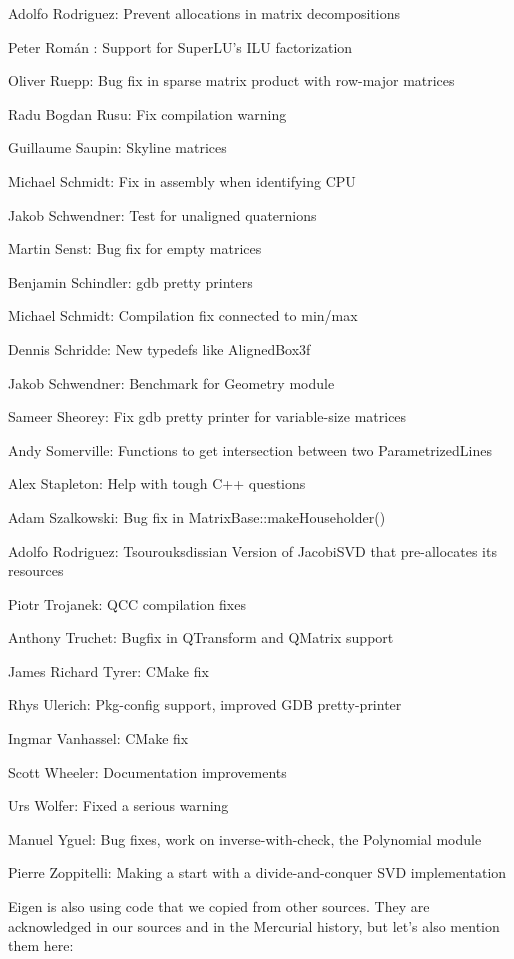 Adolfo Rodriguez:  Prevent allocations in matrix decompositions  

Peter Román : Support for SuperLU's ILU factorization  

Oliver Ruepp:  Bug fix in sparse matrix product with row-major matrices  

Radu Bogdan Rusu:  Fix compilation warning  

Guillaume Saupin:  Skyline matrices  

Michael Schmidt:  Fix in assembly when identifying CPU  

Jakob Schwendner:  Test for unaligned quaternions  

Martin Senst:  Bug fix for empty matrices  

Benjamin Schindler:  gdb pretty printers  

Michael Schmidt:  Compilation fix connected to min/max  

Dennis Schridde:  New typedefs like AlignedBox3f  

Jakob Schwendner:  Benchmark for Geometry module  

Sameer Sheorey:  Fix gdb pretty printer for variable-size matrices  

Andy Somerville:  Functions to get intersection between two ParametrizedLines  

Alex Stapleton:  Help with tough C++ questions  

Adam Szalkowski:  Bug fix in MatrixBase::makeHouseholder()  

Adolfo Rodriguez: Tsourouksdissian  Version of JacobiSVD that pre-allocates its resources  

Piotr Trojanek:  QCC compilation fixes  

Anthony Truchet:  Bugfix in QTransform and QMatrix support  

James Richard Tyrer:  CMake fix  

Rhys Ulerich:  Pkg-config support, improved GDB pretty-printer  

Ingmar Vanhassel:  CMake fix  

Scott Wheeler:  Documentation improvements  

Urs Wolfer:  Fixed a serious warning  

Manuel Yguel:  Bug fixes, work on inverse-with-check, the Polynomial module  

Pierre Zoppitelli:  Making a start with a divide-and-conquer SVD implementation  

\vpara
Eigen is also using code that we copied from other sources. They are acknowledged in our sources and in the Mercurial history, but let's also mention them here: 

